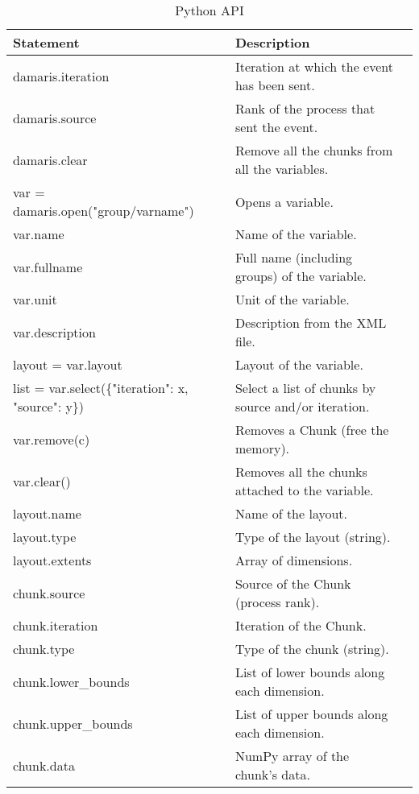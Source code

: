 \begin{table}[h]
\centering{}
   \begin{tabular}{|l|l|l|}
       \hline
       Statement & Description \\
       \hline
       \hline
       damaris.iteration & Iteration at which the event has been sent. \\
       damaris.source & Rank of the process that sent the event.\\
       damaris.clear & Remove all the chunks from all the variables. \\
       var = damaris.open("group/varname") & Opens a variable.\\
       var.name & Name of the variable.\\
       var.fullname & Full name (including groups) of the variable.\\
       var.unit & Unit of the variable.\\
       var.description & Description from the XML file. \\
       layout = var.layout & Layout of the variable.\\
       list = var.select(\{"iteration": x, "source": y\}) & Select a list of chunks by source and/or iteration.\\
       var.remove(c) & Removes a Chunk (free the memory). \\
       var.clear() & Removes all the chunks attached to the variable. \\
       layout.name & Name of the layout. \\
       layout.type & Type of the layout (string). \\
       layout.extents & Array of dimensions. \\
       chunk.source & Source of the Chunk (process rank). \\
       chunk.iteration & Iteration of the Chunk. \\
       chunk.type & Type of the chunk (string). \\
       chunk.lower\_bounds & List of lower bounds along each dimension. \\
       chunk.upper\_bounds & List of upper bounds along each dimension. \\
       chunk.data & NumPy array of the chunk's data. \\
       \hline
   \end{tabular}\caption{\Damaris{} Python API}\label{tab:pythonAPI}
\end{table}